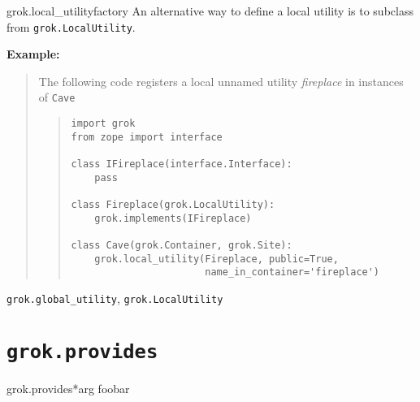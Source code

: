 \documentclass[10pt,a4paper,english]{manual}
\newcommand{\titlereference}[1]{\textsl{#1}}
\begin{document}
\begin{funcdesc}{grok.local{\_}utility}{factory}
An alternative way to define a local utility is to subclass from
\texttt{grok.LocalUtility}.

\textbf{Example:}
\begin{quote}

The following code registers a local unnamed utility \titlereference{fireplace} in
instances of \texttt{Cave}
\begin{quote}\begin{verbatim}
import grok
from zope import interface

class IFireplace(interface.Interface):
    pass

class Fireplace(grok.LocalUtility):
    grok.implements(IFireplace)

class Cave(grok.Container, grok.Site):
    grok.local_utility(Fireplace, public=True,
                       name_in_container='fireplace')
\end{verbatim}\end{quote}
\end{quote}
\begin{seealso}

\texttt{grok.global{\_}utility}, \texttt{grok.LocalUtility}
\end{seealso}

\end{funcdesc}



\section{\texttt{grok.provides}}
\begin{funcdesc}{grok.provides}{*arg}
foobar
\end{funcdesc}


\end{document}
